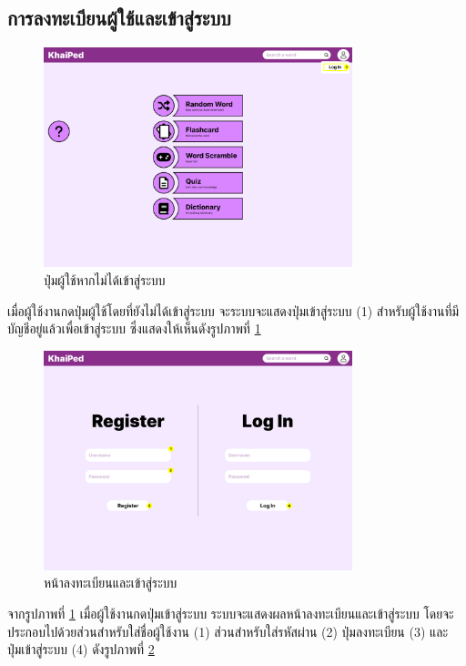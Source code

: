 \documentclass[12pt,oneside,openright,a4paper]{cpe-thai-project}
\begin{document}
\pagebreak
\subsection{การลงทะเบียนผู้ใช้และเข้าสู่ระบบ}
\begin{figure}[!h]\centering
	\includegraphics[width=0.8\textwidth, keepaspectratio=true]{image/chap3/ui/login/Home page - Guest User Button.png}
	\caption{ปุ่มผู้ใช้หากไม่ได้เข้าสู่ระบบ}\label{fig:UI_GuestButton}
\end{figure}
\hspace{1cm}
เมื่อผู้ใช้งานกดปุ่มผู้ใช้โดยที่ยังไม่ได้เข้าสู่ระบบ จะระบบจะแสดงปุ่มเข้าสู่ระบบ (1) สำหรับผู้ใช้งานที่มีบัญชีอยู่แล้วเพื่อเข้าสู่ระบบ
ซึ่งแสดงให้เห็นดังรูปภาพที่ \ref{fig:UI_GuestButton}


\begin{figure}[!h]\centering
	\includegraphics[width=0.8\textwidth, keepaspectratio=true]{image/chap3/ui/login/Home page - Register.png}
	\caption{หน้าลงทะเบียนและเข้าสู่ระบบ}\label{fig:UI_LoginPage}
\end{figure}
\hspace{1cm}
จากรูปภาพที่ \ref{fig:UI_GuestButton} เมื่อผู้ใช้งานกดปุ่มเข้าสู่ระบบ ระบบจะแสดงผลหน้าลงทะเบียนและเข้าสู่ระบบ โดยจะประกอบไปด้วยส่วนสำหรับใส่ชื่อผู้ใช้งาน (1)
ส่วนสำหรับใส่รหัสผ่าน (2) ปุ่มลงทะเบียน (3) และ ปุ่มเข้าสู่ระบบ (4) ดังรูปภาพที่ \ref{fig:UI_LoginPage}
\end{document}
